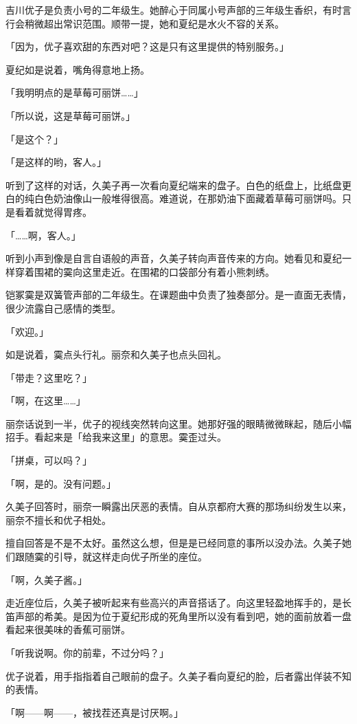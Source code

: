 \documentclass[UTF8]{ctexart}
\begin{document}
    吉川优子是负责小号的二年级生。她醉心于同属小号声部的三年级生香织，有时言行会稍微超出常识范围。顺带一提，她和夏纪是水火不容的关系。

    「因为，优子喜欢甜的东西对吧？这是只有这里提供的特别服务。」

    夏纪如是说着，嘴角得意地上扬。

    「我明明点的是草莓可丽饼……」

    「所以说，这是草莓可丽饼。」

    「是这个？」

    「是这样的哟，客人。」

    听到了这样的对话，久美子再一次看向夏纪端来的盘子。白色的纸盘上，比纸盘更白的纯白色奶油像山一般堆得很高。难道说，在那奶油下面藏着草莓可丽饼吗。只是看着就觉得胃疼。

    「……啊，客人。」

    听到小声到像是自言自语般的声音，久美子转向声音传来的方向。她看见和夏纪一样穿着围裙的霙向这里走近。在围裙的口袋部分有着小熊刺绣。

    铠冢霙是双簧管声部的二年级生。在课题曲中负责了独奏部分。是一直面无表情，很少流露自己感情的类型。

    「欢迎。」

    如是说着，霙点头行礼。丽奈和久美子也点头回礼。

    「带走？这里吃？」

    「啊，在这里……」

    丽奈话说到一半，优子的视线突然转向这里。她那好强的眼睛微微眯起，随后小幅招手。看起来是「给我来这里」的意思。霙歪过头。

    「拼桌，可以吗？」

    「啊，是的。没有问题。」

    久美子回答时，丽奈一瞬露出厌恶的表情。自从京都府大赛的那场纠纷发生以来，丽奈不擅长和优子相处。

    擅自回答是不是不太好。虽然这么想，但是是已经同意的事所以没办法。久美子她们跟随霙的引导，就这样走向优子所坐的座位。

    「啊，久美子酱。」

    走近座位后，久美子被听起来有些高兴的声音搭话了。向这里轻盈地挥手的，是长笛声部的希美。是因为位于夏纪形成的死角里所以没有看到吧，她的面前放着一盘看起来很美味的香蕉可丽饼。

    「听我说啊。你的前辈，不过分吗？」

    优子说着，用手指指着自己眼前的盘子。久美子看向夏纪的脸，后者露出佯装不知的表情。

    「啊——啊——，被找茬还真是讨厌啊。」
\end{document}
